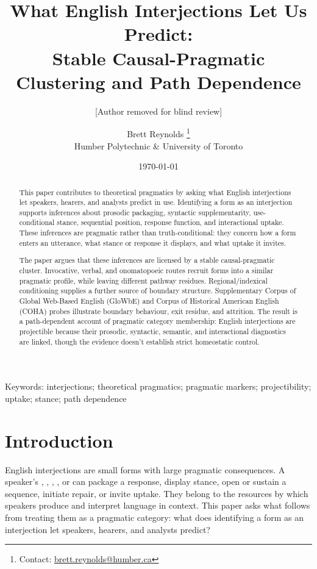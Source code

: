 \documentclass[12pt]{article}
\title{What English Interjections Let Us Predict:\\
Stable Causal-Pragmatic Clustering and Path Dependence}
\author{[Author removed for blind review]}
\author{Brett Reynolds \orcidlink{0000-0003-0073-7195}%
\thanks{Contact: \href{mailto:brett.reynolds@humber.ca}{brett.reynolds@humber.ca}}\\
Humber Polytechnic \& University of Toronto}
\date{\today}
\begin{document}
\maketitle

\begin{abstract}
This paper contributes to theoretical pragmatics by asking what English
interjections let speakers, hearers, and analysts predict in use.
Identifying a form as an interjection supports inferences about
prosodic packaging, syntactic supplementarity, use-conditional stance,
sequential position, response function, and interactional uptake. These
inferences are pragmatic rather than truth-conditional: they concern how
a form enters an utterance, what stance or response it displays, and
what uptake it invites.

The paper argues that these inferences are licensed by a stable
causal-pragmatic cluster. Invocative, verbal, and onomatopoeic routes
recruit forms into a similar pragmatic profile, while leaving different
pathway residues. Regional/indexical conditioning supplies a further
source of boundary structure. Supplementary Corpus of Global Web-Based
English (GloWbE) and Corpus of Historical American English (COHA) probes
illustrate boundary behaviour, exit residue, and attrition. The result
is a path-dependent account of pragmatic category membership: English
interjections are projectible because their prosodic, syntactic,
semantic, and interactional diagnostics are linked, though the evidence
doesn't establish strict homeostatic control.
\end{abstract}

\noindent Keywords: interjections; theoretical pragmatics; pragmatic
markers; projectibility; uptake; stance; path dependence

\section{Introduction}\label{sec:intro}

English interjections are small forms with large pragmatic
consequences. A speaker's , , ,
, or  can package a response, display
stance, open or sustain a sequence, initiate repair, or invite uptake.
They belong to the resources by which speakers produce and interpret
language in context. This paper asks what follows from treating them as
a pragmatic category: what does identifying a form as an interjection
let speakers, hearers, and analysts predict?
\end{document}
